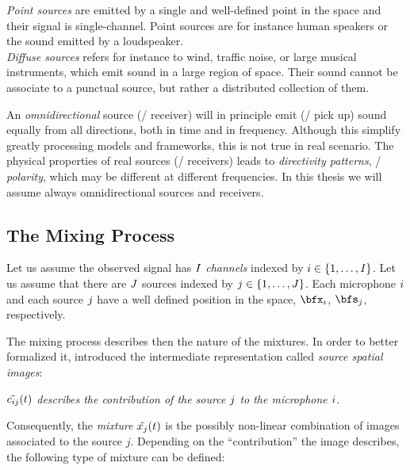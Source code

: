 \textit{Point sources} are emitted by a single and well-defined point in the space and their signal is single-channel.
Point sources are for instance human speakers or the sound emitted by a loudspeaker.
\\\textit{Diffuse sources} refers for instance to wind, traffic noise, or large musical instruments, which emit sound in a large region of space.
Their sound cannot be associate to a punctual source, but rather a distributed collection of them.

An \textit{omnidirectional} source (\resp/ receiver) will in principle emit (\resp/ pick up) sound equally from all directions,
both in time and in frequency.
Although this simplify greatly processing models and frameworks, this is not true in real scenario.
The physical properties of real sources (\resp/ receivers) leads to \textit{directivity patterns}, \aka/ \textit{polarity}, which may
be different at different frequencies.
In this thesis we will assume always omnidirectional sources and receivers.

\subsection{The Mixing Process}
Let us assume the observed signal has $I$ \textit{channels} indexed by $\idxMic \in \kbrace{1,\dots,\numMics}$.
Let us assume that there are $J$ sources indexed by $\idxSrc \in \kbrace{1,\dots,\numSrcs}$.
Each microphone $i$ and each source $j$ have a well defined position in the space, $\positionMicrophone_\idxMic$, $\positionSource_\idxSrc$, respectively.

The mixing process describes then the nature of the mixtures.
In order to better formalized it, \citeauthor{sturmel2012linear} introduced the intermediate representation called \emph{source spatial images}:
\begin{center}
    \textit{$\contTime[t]{\img_{\idxMic\idxSrc}}$ describes the contribution of the source $j$ to the microphone $i$}.
\end{center}
Consequently, the \textit{mixture} $\contTime[t]{\mic_{\idxSrc}}$ is the possibly non-linear combination of images associated to the source $j$.
Depending on the ``contribution'' the image describes, the following type of mixture can be defined:

